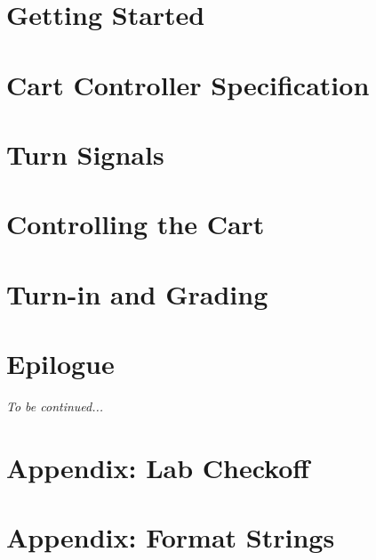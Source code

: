     \section{Getting Started} \label{sec:GettingStarted}                

    \section{Cart Controller Specification} \label{sec:spec}            

    \section{Turn Signals} \label{sec:turnSignals}                      

    \section{Controlling the Cart} \label{sec:cartController}           

    \section{Turn-in and Grading}                                       

    \section*{Epilogue}                                                 \LauraDern

    \textit{To be continued...}

    \appendix

    \section{Appendix: Lab Checkoff}                                    

    \section{Appendix: Format Strings} \label{sec:formatStrings}        


